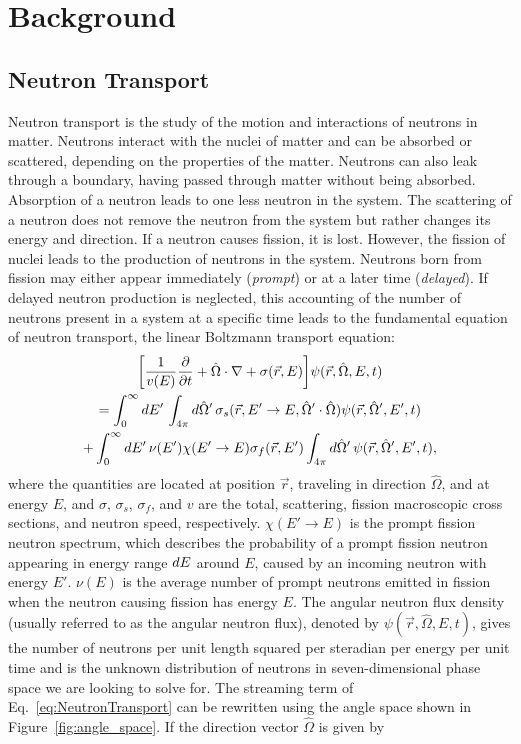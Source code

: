 \chapter{Background}

\section{Neutron Transport}

Neutron transport is the study of the motion and interactions of neutrons in matter. Neutrons interact with the nuclei of matter and can be absorbed or scattered, depending on the properties of the matter. Neutrons can also leak through a boundary, having passed through matter without being absorbed. Absorption of a neutron leads to one less neutron in the system. The scattering of a neutron does not remove the neutron from the system but rather changes its energy and direction. If a neutron causes fission, it is lost. However, the fission of nuclei leads to the production of neutrons in the system. Neutrons born from fission may either appear immediately (\textit{prompt}) or at a later time (\textit{delayed}). If delayed neutron production is neglected, this accounting of the number of neutrons present in a system at a specific time leads to the fundamental equation of neutron transport, the linear Boltzmann transport equation:
\begin{multline}
	\bigg [ \frac{1}{v(E)} \frac{\partial}{\partial t} + \hat{\Omega} \cdot \nabla + \sigma(\vec{r},E) \bigg ] \psi(\vec{r},\hat{\Omega},E,t) \\ = \int_{0}^{\infty} \mathop{}\!d E' \, \int_{4\pi} \mathop{}\!d \hat{\Omega}' \, \sigma_{s}(\vec{r},E'\rightarrow E,\hat{\Omega}' \cdot \hat{\Omega}) \psi(\vec{r},\hat{\Omega}',E',t) \\ + \int_{0}^{\infty} \mathop{}\!d E' \, \nu(E') \chi(E'\rightarrow E) \sigma_{f}(\vec{r},E') \int_{4\pi} \mathop{}\!d \hat{\Omega}' \, \psi(\vec{r},\hat{\Omega}',E',t), 
	\label{eq:NeutronTransport}
\end{multline}
where the quantities are located at position $\vec{r}$, traveling in direction $\hat{\Omega}$, and at energy $E$, and $\sigma$, $\sigma_{s}$, $\sigma_{f}$, and $v$ are the total, scattering, fission macroscopic cross sections, and neutron speed, respectively. $\chi(E'\rightarrow E)$ is the prompt fission neutron spectrum, which describes the probability of a prompt fission neutron appearing in energy range $\mathop{}\!d E$ around $E$, caused by an incoming neutron with energy $E'$. $\nu(E)$ is the average number of prompt neutrons emitted in fission when the neutron causing fission has energy $E$. The angular neutron flux density (usually referred to as the angular neutron flux), denoted by $\psi(\vec{r},\hat{\Omega},E,t)$, gives the number of neutrons per unit length squared per steradian per energy per unit time and is the unknown distribution of neutrons in seven-dimensional phase space we are looking to solve for. The streaming term of Eq.~\ref{eq:NeutronTransport} can be rewritten using the angle space shown in Figure~\ref{fig:angle_space}. If the direction vector $\hat{\Omega}$ is given by
